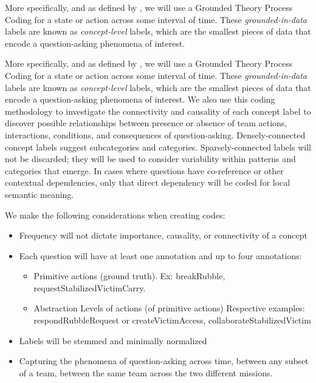 More specifically, and as defined by \citet{saldana_2021}, we will use a
Grounded Theory Process Coding for a state or action across some interval of
time. These \emph{grounded-in-data} labels are known as \emph{concept-level}
labels, which are the smallest pieces of data that encode a question-asking
phenomena of interest.

More specifically, and as defined by \citet{saldana_2021}, we will use a
Grounded Theory Process Coding for a state or action across some interval of
time. These \emph{grounded-in-data} labels are known as \emph{concept-level}
labels, which are the smallest pieces of data that encode a question-asking
phenomena of interest. We also use this coding methodology to investigate the connectivity and
causality of each concept label to discover possible relationships between
presence or absence of team actions, interactions, conditions, and consequences
of question-asking. Densely-connected concept labels suggest subcategories and
categories. Sparsely-connected labels will not be discarded; they will be used
to consider variability within patterns and categories that emerge. In cases
where questions have co-reference or other contextual dependencies, only that
direct dependency will be coded for local semantic meaning.

We make the following considerations when creating codes: 

\begin{itemize}
    \item Frequency will not dictate importance, causality, or connectivity of a concept
    \item Each question will have at least one annotation and up to four
      annotations:
    \begin{itemize}
        \item Primitive actions (ground truth). Ex: breakRubble,
          requestStabilizedVictimCarry.
        \item Abstraction Levels of actions (of primitive actions) Respective
          examples: respondRubbleRequest or createVictimAccess, collaborateStabilizedVictim
    \end{itemize}
    \item Labels will be stemmed and minimally normalized
    \item Capturing the phenomena of question-asking across time, between any subset of a team, between the same team across the two different missions. 
\end{itemize}


